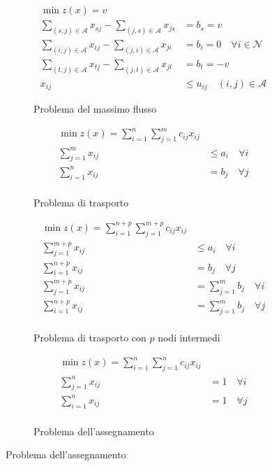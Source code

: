 \documentclass[\main/main.tex]{subfiles}
\begin{document}
\begin{figure}
\begin{subfigure}{0.31\textwidth}
	\end{subfigure}
	\begin{subfigure}{0.31\textwidth}
		\begin{align*}
			\min z(x) = v                                                                                                         \\
			\sum_{(s,j) \in \mathcal{A}} x_{sj} - \sum_{(j,s) \in \mathcal{A}} x_{js} & = b_s =v                                  \\
			\sum_{(i,j) \in \mathcal{A}} x_{ij} - \sum_{(j,i) \in \mathcal{A}} x_{ji} & = b_i = 0 \quad \forall i \in \mathcal{N} \\
			\sum_{(t,j) \in \mathcal{A}} x_{tj} - \sum_{(j,t) \in \mathcal{A}} x_{jt} & = b_t = -v                                \\
			x_{ij}                                                                    & \leq u_{ij} \quad (i,j) \in \mathcal{A}
		\end{align*}
		\caption{Problema del massimo flusso}
	\end{subfigure}
	\begin{subfigure}{0.31\textwidth}
		\begin{align*}
			\min z(x) = \sum_{i=1}^n\sum_{j=1}^m c_{ij}x_{ij} \\
			\sum_{j=1}^m x_{ij} & \leq a_i \quad \forall i    \\
			\sum_{i=1}^n x_{ij} & = b_j  \quad \forall j      \\
		\end{align*}
		\caption{Problema di trasporto}
	\end{subfigure}
	\begin{subfigure}{0.45\textwidth}
		\begin{align*}
			\min z(x) = \sum_{i=1}^{n+p}\sum_{j=1}^{m+p} c_{ij}x_{ij}       \\
			\sum_{j=1}^{m+p} x_{ij} & \leq a_i \quad \forall i              \\
			\sum_{i=1}^{n+p} x_{ij} & = b_j    \quad \forall j              \\
			\sum_{j=1}^{m+p} x_{ij} & = \sum_{j=1}^m b_j    \quad \forall i \\
			\sum_{i=1}^{n+p} x_{ij} & = \sum_{j=1}^m b_j    \quad \forall j \\
		\end{align*}
		\caption{Problema di trasporto con $p$ nodi intermedi}
	\end{subfigure}
	\begin{subfigure}{0.45\textwidth}
		\begin{align*}
			\min z(x) = \sum_{i=1}^n\sum_{j=1}^n c_{ij}x_{ij} \\
			\sum_{j=1}^n x_{ij} & = 1 \quad \forall i         \\
			\sum_{i=1}^n x_{ij} & = 1  \quad \forall j        \\
		\end{align*}
		\caption{Problema dell'assegnamento}
	\end{subfigure}
\end{figure}
\end{document}
